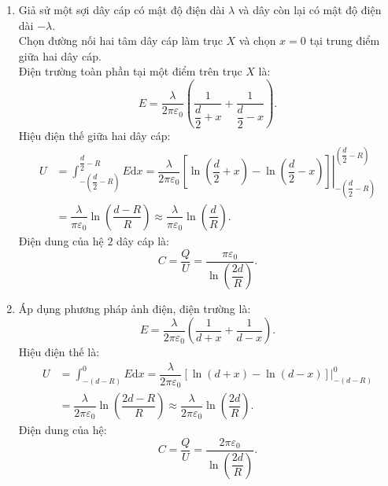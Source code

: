 \begin{loigiai}
\begin{enumerate}[1)]
    \item Giả sử một sợi dây cáp có mật độ điện dài $\lambda$ và dây còn lại có mật độ điện dài $-\lambda$.\\
    Chọn đường nối hai tâm dây cáp làm trục $X$ và chọn $x=0$ tại trung điểm giữa hai dây cáp.\\
    Điện trường toàn phần tại một điểm trên trục $X$ là:
    \[E=\dfrac{\lambda}{2\pi\varepsilon_0}\left(\dfrac{1}{\dfrac{d}{2}+x}+\dfrac{1}{\dfrac{d}{2}-x}\right).\]
    Hiệu điện thế giữa hai dây cáp:
    \begin{align*}
    U&=\int_{-(\dfrac{d}{2}-R)}^{\dfrac{d}{2}-R}E\mathrm{d}x=\dfrac{\lambda}{2\pi\varepsilon_0}\left.\left[\ln{\left(\dfrac{d}{2}+x\right)}-\ln{\left(\dfrac{d}{2}-x\right)}\right]\right|_{-\left(\dfrac{d}{2}-R\right)}^{\left(\dfrac{d}{2}-R\right)}\\
    &=\dfrac{\lambda}{\pi\varepsilon_0}\ln{\left(\dfrac{d-R}{R}\right)}\approx \dfrac{\lambda}{\pi\varepsilon_0}\ln{\left(\dfrac{d}{R}\right)}.
    \end{align*}
    Điện dung của hệ $2$ dây cáp là:
    \[C=\dfrac{Q}{U}=\dfrac{\pi\varepsilon_0}{\ln{\left(\dfrac{2d}{R}\right)}}.\]
    \item Áp dụng phương pháp ảnh điện, điện trường là:
    \[E=\dfrac{\lambda}{2\pi\varepsilon_0}\left(\dfrac{1}{d+x}+\dfrac{1}{d-x}\right).\]
    Hiệu điện thế là:
    \begin{align*}
        U&=\int_{-(d-R)}^{0}E\mathrm{d}x=\dfrac{\lambda}{2\pi\varepsilon_0}\left.\left[\ln{(d+x)-\ln{(d-x)}}\right]\right|_{-(d-R)}^{0}\\
        &=\dfrac{\lambda}{2\pi\varepsilon_0}\ln{\left(\dfrac{2d-R}{R}\right)}\approx \dfrac{\lambda}{2\pi\varepsilon_0}\ln{\left(\dfrac{2d}{R}\right)}.
        \end{align*}
        Điện dung của hệ:
        \[C=\dfrac{Q}{U}=\dfrac{2\pi\varepsilon_0}{\ln{\left(\dfrac{2d}{R}\right)}}.\]
\end{enumerate}
\end{loigiai}

